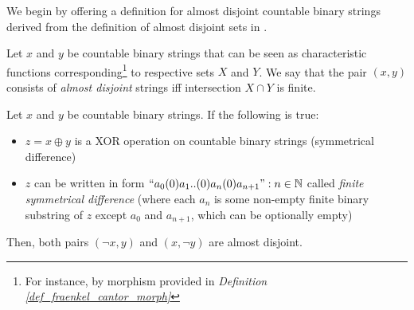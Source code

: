 We begin by offering a definition for almost disjoint countable binary strings derived from the definition of almost disjoint sets in \cite{jech2003set}.

\begin{definition}\label{def_almost_disjoint_strings}
  Let $x$ and $y$ be countable binary strings that can be seen as characteristic functions corresponding\footnote{For instance, by morphism provided in \textit{Definition \ref{def_fraenkel_cantor_morph}}} to respective sets $X$ and $Y$. We say that the pair $(x, y)$ consists of \textit{almost disjoint} strings iff intersection $X \cap Y$ is finite.
\end{definition}

\begin{lemma}\label{lemma_disjoint_to_adjoint}
  Let $x$ and $y$ be countable binary strings. If the following is true: 
  \begin{itemize}
    \item $z = x \oplus y$ is a XOR operation on countable binary strings (symmetrical difference)
    \item $z$ can be written in form $\text{``} a_0(0)a_1..(0)a_n(0)a_{n+1} \text{''} : n \in \mathbb{N}$ called \textit{finite symmetrical difference} (where each $a_n$ is some non-empty finite binary substring of $z$ except $a_0$ and $a_{n+1}$, which can be optionally empty)
  \end{itemize}
  Then, both pairs $(\neg x, y)$ and $(x, \neg y)$ are almost disjoint.
\end{lemma}
